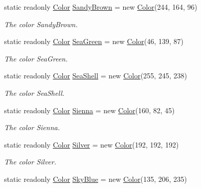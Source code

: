 \begin{DoxyCompactItemize}
static readonly \hyperlink{struct_tri_devs_1_1_tri_engine2_d_1_1_color}{Color} \hyperlink{struct_tri_devs_1_1_tri_engine2_d_1_1_color_a2107692671cc4d4e1651bca03301c25f}{Sandy\-Brown} = new \hyperlink{struct_tri_devs_1_1_tri_engine2_d_1_1_color}{Color}(244, 164, 96)
\begin{DoxyCompactList}\small\item\em The color Sandy\-Brown. \end{DoxyCompactList}\item 
static readonly \hyperlink{struct_tri_devs_1_1_tri_engine2_d_1_1_color}{Color} \hyperlink{struct_tri_devs_1_1_tri_engine2_d_1_1_color_abd4d46ec3d7c34147f8eea9d6b4d730b}{Sea\-Green} = new \hyperlink{struct_tri_devs_1_1_tri_engine2_d_1_1_color}{Color}(46, 139, 87)
\begin{DoxyCompactList}\small\item\em The color Sea\-Green. \end{DoxyCompactList}\item 
static readonly \hyperlink{struct_tri_devs_1_1_tri_engine2_d_1_1_color}{Color} \hyperlink{struct_tri_devs_1_1_tri_engine2_d_1_1_color_a66e453bd0453e666d704d6287babdaaf}{Sea\-Shell} = new \hyperlink{struct_tri_devs_1_1_tri_engine2_d_1_1_color}{Color}(255, 245, 238)
\begin{DoxyCompactList}\small\item\em The color Sea\-Shell. \end{DoxyCompactList}\item 
static readonly \hyperlink{struct_tri_devs_1_1_tri_engine2_d_1_1_color}{Color} \hyperlink{struct_tri_devs_1_1_tri_engine2_d_1_1_color_a1a0e4c9ae6d838505bcd78aee6244722}{Sienna} = new \hyperlink{struct_tri_devs_1_1_tri_engine2_d_1_1_color}{Color}(160, 82, 45)
\begin{DoxyCompactList}\small\item\em The color Sienna. \end{DoxyCompactList}\item 
static readonly \hyperlink{struct_tri_devs_1_1_tri_engine2_d_1_1_color}{Color} \hyperlink{struct_tri_devs_1_1_tri_engine2_d_1_1_color_a00bfc238fedd090788bf19b682dd734e}{Silver} = new \hyperlink{struct_tri_devs_1_1_tri_engine2_d_1_1_color}{Color}(192, 192, 192)
\begin{DoxyCompactList}\small\item\em The color Silver. \end{DoxyCompactList}\item 
static readonly \hyperlink{struct_tri_devs_1_1_tri_engine2_d_1_1_color}{Color} \hyperlink{struct_tri_devs_1_1_tri_engine2_d_1_1_color_ad049225cef59cc367954411fe01965ec}{Sky\-Blue} = new \hyperlink{struct_tri_devs_1_1_tri_engine2_d_1_1_color}{Color}(135, 206, 235)

\end{DoxyCompactItemize}

